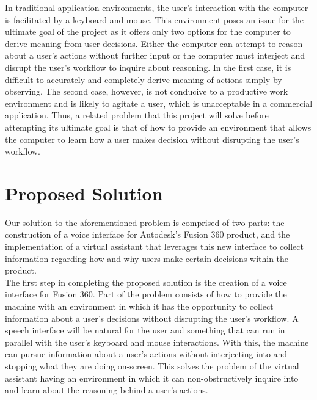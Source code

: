 \documentclass[10pt, draftclsnofoot, onecolumn]{IEEEtran}
\begin{document}
In traditional application environments, the user’s interaction with the computer is facilitated by a keyboard and mouse. This environment poses an issue for the ultimate goal of the project as it offers only two options for the computer to derive meaning from user decisions. Either the computer can attempt to reason about a user’s actions without further input or the computer must interject and disrupt the user’s workflow to inquire about reasoning. In the first case, it is difficult to accurately and completely derive meaning of actions simply by observing. The second case, however, is not conducive to a productive work environment and is likely to agitate a user, which is unacceptable in a commercial application. Thus, a related problem that this project will solve before attempting its ultimate goal is that of how to provide an environment that allows the computer to learn how a user makes decision without disrupting the user’s workflow. \\

\section*{Proposed Solution}
Our solution to the aforementioned problem is comprised of two parts: the construction of a voice interface for Autodesk’s Fusion 360 product, and the implementation of a virtual assistant that leverages this new interface to collect information regarding how and why users make certain decisions within the product. \\

The first step in completing the proposed solution is the creation of a voice interface for Fusion 360. Part of the problem consists of how to provide the machine with an environment in which it has the opportunity to collect information about a user’s decisions without disrupting the user’s workflow. A speech interface will be natural for the user and something that can run in parallel with the user’s keyboard and mouse interactions. With this, the machine can pursue information about a user’s actions without interjecting into and stopping what they are doing on-screen. This solves the problem of the virtual assistant having an environment in which it can non-obstructively inquire into and learn about the reasoning behind a user’s actions. \\
\end{document}
